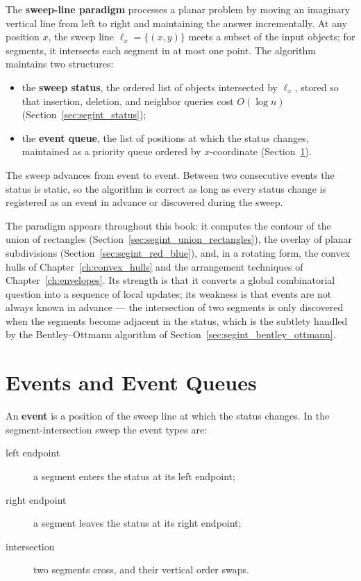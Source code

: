 The \textbf{sweep-line paradigm} processes a
planar problem by moving an imaginary vertical line from left to right and
maintaining the answer incrementally. At any position $x$, the sweep line
$\ell_x = \{(x,y)\}$ meets a subset of the input objects; for segments, it
intersects each segment in at most one point. The algorithm maintains two
structures:
\begin{itemize}
  \item the \textbf{sweep status}, the ordered list of
    objects intersected by $\ell_x$, stored so that insertion, deletion, and
    neighbor queries cost $O(\log n)$ (Section~\ref{sec:segint_status});
  \item the \textbf{event queue}, the list of positions
    at which the status changes, maintained as a priority queue ordered by
    $x$-coordinate (Section~\ref{sec:segint_events}).
\end{itemize}
The sweep advances from event to event. Between two consecutive events the
status is static, so the algorithm is correct as long as every status change
is registered as an event in advance or discovered during the sweep.

The paradigm appears throughout this book: it computes the contour of the
union of rectangles (Section~\ref{sec:segint_union_rectangles}), the overlay
of planar subdivisions (Section~\ref{sec:segint_red_blue}), and, in a
rotating form, the convex hulls of Chapter~\ref{ch:convex_hulls} and the
arrangement techniques of Chapter~\ref{ch:envelopes}. Its strength is that
it converts a global combinatorial question into a sequence of local
updates; its weakness is that events are not always known in advance --- the
intersection of two segments is only discovered when the segments become
adjacent in the status, which is the subtlety handled by the Bentley--Ottmann
algorithm of Section~\ref{sec:segint_bentley_ottmann}.


\section{Events and Event Queues}
\label{sec:segint_events}

An \textbf{event} is a position of the sweep line at which the
status changes. In the segment-intersection sweep the event types are:
\begin{description}
  \item[left endpoint] a segment enters the status at its left endpoint;
  \item[right endpoint] a segment leaves the status at its right endpoint;
  \item[intersection] two segments cross, and their vertical order swaps.
\end{description}

